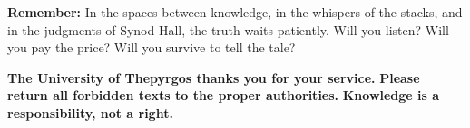 \documentclass[11pt]{article}
\begin{document}
\begin{center}

\vspace{2cm}

\textbf{Remember:} In the spaces between knowledge, in the whispers of the stacks, and in the judgments of Synod Hall, the truth waits patiently. Will you listen? Will you pay the price? Will you survive to tell the tale?

\textbf{The University of Thepyrgos thanks you for your service.}
\textbf{Please return all forbidden texts to the proper authorities.}
\textbf{Knowledge is a responsibility, not a right.}
\end{center}
\end{document}
